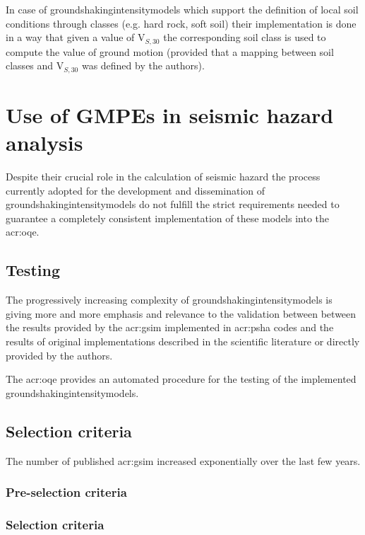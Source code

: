 In case of \glspl{groundshakingintensitymodel} which support the definition 
of local soil conditions through classes (e.g. hard rock, soft soil) their
implementation is done in a way that given a value of V$_{S,30}$ the
corresponding soil class is used to compute the value of ground motion 
(provided that a mapping between soil classes and V$_{S,30}$ was defined 
by the authors).
%
\section{Use of GMPEs in seismic hazard analysis}
% 
Despite their crucial role in the calculation of seismic hazard the process
currently adopted for the development and dissemination of
\glspl{groundshakingintensitymodel} do not fulfill the strict requirements
needed to guarantee a completely consistent implementation of these models into
the \gls{acr:oqe}.
%
\subsection{Testing}
%
The progressively increasing complexity of \glspl{groundshakingintensitymodel}
is giving more and more emphasis and relevance to the validation between 
between the results provided by the \gls{acr:gsim} implemented in
\gls{acr:psha} codes and the results of original implementations 
described in the scientific literature or directly provided by the authors.

The \gls{acr:oqe} provides an automated procedure for the testing of 
the implemented \glspl{groundshakingintensitymodel}. 
%
\subsection{Selection criteria}
The number of published \gls{acr:gsim} increased exponentially over the last
few years.  
%
\subsubsection{Pre-selection criteria}
\cite{cotton2006} 

%
\subsubsection{Selection criteria}
%
%
